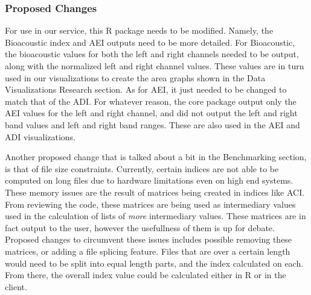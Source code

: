 \subsubsection{Proposed Changes}
For use in our service, this R package needs to be modified. Namely, the Bioacoustic index and AEI outputs need to be more detailed. For Bioacoustic, the bioacoustic values for both the left and right channels needed to be output, along with the normalized left and right channel values. These values are in turn used in our visualizations to create the area graphs shown in the Data Visualizations Research section. As for AEI, it just needed to be changed to match that of the ADI. For whatever reason, the core package output only the AEI values for the left and right channel, and did not output the left and right band values and left and right band ranges. These are also used in the AEI and ADI visualizations.\par
Another proposed change that is talked about a bit in the Benchmarking section, is that of file size constraints. Currently, certain indices are not able to be computed on long files due to hardware limitations even on high end systems. These memory issues are the result of matrices being created in indices like ACI. From reviewing the code, these matrices are being used as intermediary values used in the calculation of lists of \textit{more} intermediary values. These matrices are in fact output to the user, however the usefullness of them is up for debate. Proposed changes to circumvent these issues includes possible removing these matrices, or adding a file splicing feature. Files that are over a certain length would need to be split into equal length parts, and the index calculated on each. From there, the overall index value could be calculated either in R or in the client.
